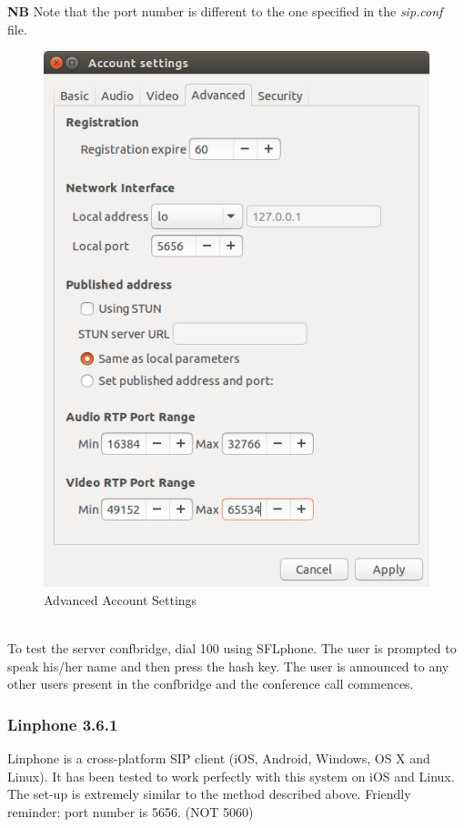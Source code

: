 \documentclass[a4paper,11pt]{report}
\begin{document}
\newpage
\textbf{NB} Note that the port number is different to the one specified in the \textit{sip.conf} file.
\begin{figure}[h]
  \begin{center}
    \includegraphics[scale = 0.4]{SIP_adv_settings}
    \caption{Advanced Account Settings}
  \end{center}
\end{figure}\\
To test the server confbridge, dial 100 using SFLphone. The user is prompted to speak his/her name and then press the hash key. The user is announced to any other users present in the confbridge  and the conference call commences.
\subsubsection{Linphone 3.6.1}
Linphone is a cross-platform SIP client (iOS, Android, Windows, OS X and Linux). It has been tested to work perfectly with this system on iOS and Linux. The set-up is extremely similar to the method described above. Friendly reminder: port number is 5656. (NOT 5060)
\end{document}
